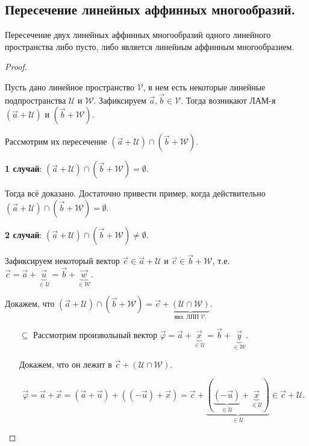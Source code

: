 \subsection{
    Пересечение линейных аффинных многообразий.
}

\begin{theorem}
    Пересечение двух линейных аффинных многообразий одного линейного пространства либо пусто, либо является линейным аффинным многообразием.
\end{theorem}

\begin{proof}~

    Пусть дано линейное пространство $\mathcal{V}$, в нем есть некоторые линейные подпространства $\mathcal{U}$ и $\mathcal{W}$. Зафиксируем $\vec{a}, \vec{b} \in \mathcal{V}$. Тогда возникают ЛАМ-я $(\vec{a} + \mathcal{U})$ и $(\vec{b} + \mathcal{W})$.

    Рассмотрим их пересечение $(\vec{a} + \mathcal{U}) \cap (\vec{b} + \mathcal{W})$.

    \textbf{1 случай}: $(\vec{a} + \mathcal{U}) \cap (\vec{b} + \mathcal{W}) = \emptyset$.

    Тогда всё доказано. Достаточно привести пример, когда действительно $(\vec{a} + \mathcal{U}) \cap (\vec{b} + \mathcal{W}) = \emptyset$.

    \bigbreak

    \textbf{2 случай}: $(\vec{a} + \mathcal{U}) \cap (\vec{b} + \mathcal{W}) \ne \emptyset$.

    Зафиксируем некоторый вектор $\vec{c} \in \vec{a} + \mathcal{U}$ и $\vec{c} \in \vec{b} + \mathcal{W}$, т.е. $\vec{c} = \vec{a} + \underbrace{\vec{u}}_{\in \mathcal{U}} = \vec{b} + \underbrace{\vec{w}}_{\in \mathcal{W}}$.

    Докажем, что $(\vec{a} + \mathcal{U}) \cap (\vec{b} + \mathcal{W}) = \vec{c} + \underbrace{(\mathcal{U} \cap \mathcal{W})}_{\text{явл. ЛПП } \mathcal{V}.}$.

    \begin{enumerate}
        \item[$\subseteq$] Рассмотрим произвольный вектор $\vec{\varphi} = \vec{a} + \underbrace{\vec{x}}_{\in \mathcal{U}} =\vec{b} + \underbrace{\vec{y}}_{\in \mathcal{W}}.$
    
        Докажем, что он лежит в $\vec{c} + (\mathcal{U} \cap \mathcal{W})$.
    
        $$\vec{\varphi} = \vec{a} + \vec{x} = (\vec{a} + \vec{u}) + ((-\vec{u}) + \vec{x}) = \vec{c} + \underbrace{(\underbrace{(-\vec{u})}_{\in \mathcal{U}} + \underbrace{\vec{x}}_{\in \mathcal{U}})}_{\in \mathcal{U}} \in \vec{c} +\mathcal{U}.$$
    

\end{enumerate}
\end{proof}
